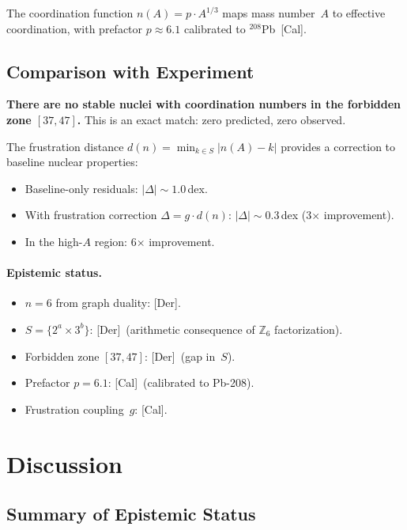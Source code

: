 \documentclass[12pt,a4paper]{article}
\theoremstyle{definition}
\theoremstyle{remark}
\newcommand{\tagDer}{\textsf{[Der]}}
\newcommand{\tagCal}{\textsf{[Cal]}}
\newcommand{\Zn}[1]{\mathbb{Z}_{#1}}
\begin{document}
The coordination function $n(A) = p \cdot A^{1/3}$ maps mass
number~$A$ to effective coordination, with prefactor $p \approx 6.1$
calibrated to ${}^{208}$Pb~\tagCal.

\subsection{Comparison with Experiment}

\textbf{There are no stable nuclei with coordination numbers in the
forbidden zone $[37,47]$.}  This is an exact match: zero predicted,
zero observed.

The frustration distance $d(n) = \min_{k \in S} |n(A) - k|$ provides
a correction to baseline nuclear properties:
\begin{itemize}[nosep]
\item Baseline-only residuals: $|\Delta| \sim 1.0$\,dex.
\item With frustration correction $\Delta = g \cdot d(n)$:
  $|\Delta| \sim 0.3$\,dex (3$\times$ improvement).
\item In the high-$A$ region: 6$\times$ improvement.
\end{itemize}

\paragraph{Epistemic status.}
\begin{itemize}[nosep]
\item $n = 6$ from graph duality: \tagDer.
\item $S = \{2^a \times 3^b\}$: \tagDer\ (arithmetic consequence of
  $\Zn{6}$ factorization).
\item Forbidden zone $[37,47]$: \tagDer\ (gap in~$S$).
\item Prefactor $p = 6.1$: \tagCal\ (calibrated to Pb-208).
\item Frustration coupling~$g$: \tagCal.
\end{itemize}

\section{Discussion}
\label{sec:discussion}

\subsection{Summary of Epistemic Status}
\end{document}
